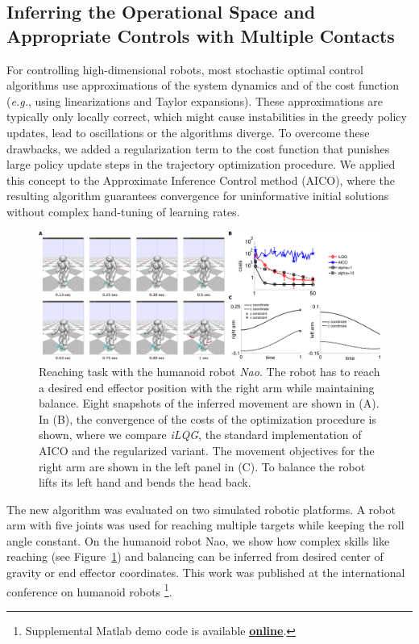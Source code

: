 \documentclass[final,5p,twocolumn]{elsarticle}
\begin{document}
\subsection{Inferring the Operational Space and Appropriate Controls with Multiple Contacts}

For controlling high-dimensional robots, most stochastic optimal control
algorithms use approximations of the system dynamics and of the cost function
(\textit{e.g.}, using linearizations and Taylor expansions). These approximations are
typically only locally correct, which might cause instabilities in the greedy
policy updates, lead to oscillations or the algorithms diverge. To overcome
these drawbacks, we added a regularization term to the cost function that punishes
large policy update steps in the trajectory optimization procedure. We applied
this concept to the Approximate Inference Control method (AICO), where the
resulting algorithm guarantees convergence for uninformative initial solutions
without complex hand-tuning of learning rates. 

\begin{figure}[t]
  \begin{center}
  \includegraphics[width=\linewidth]{./sections/WP4/pics_elmar/NaoReachingTask.png}
  \end{center}
  \caption{Reaching task with the humanoid robot \textit{Nao}. The robot has to
reach  a desired end effector position with the right arm while maintaining
balance. Eight snapshots of the inferred movement are shown in (A). In (B), the
convergence of the costs of the optimization procedure is shown, where we
compare \textit{iLQG}, the standard implementation of AICO and the regularized
variant. The movement objectives for the right arm are shown in the left panel
in (C). To balance the robot lifts its left hand and bends the head back.}
  \label{fig:naoReachingTask}
  \end{figure}

The new algorithm was evaluated on
two simulated robotic platforms. A robot arm with five joints was used for
reaching multiple targets while keeping the roll angle constant. On the humanoid
robot Nao, we show how complex skills like reaching (see Figure~\ref{fig:naoReachingTask}) and balancing can be
inferred from desired center of gravity or end effector coordinates. This work was published at 
the international conference on humanoid robots \cite{Rueckert2014}\footnote{Supplemental Matlab demo code is available \href{http://www.ausy.tu-darmstadt.de/Team/ElmarRueckert}{\textbf{\underline{online}}}.}. 
\end{document}
